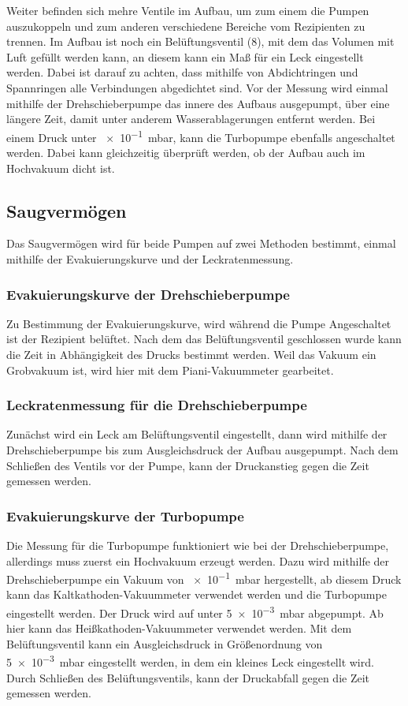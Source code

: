Weiter befinden sich mehre Ventile im Aufbau, um zum einem die Pumpen auszukoppeln und zum anderen verschiedene Bereiche vom Rezipienten zu trennen. Im Aufbau ist noch ein Belüftungsventil (8), mit dem das Volumen mit Luft gefüllt werden kann, an diesem kann ein Maß für ein Leck eingestellt werden.
Dabei ist darauf zu achten, dass mithilfe von Abdichtringen und Spannringen alle Verbindungen abgedichtet sind.
Vor der Messung wird einmal mithilfe der Drehschieberpumpe  das innere des Aufbaus ausgepumpt, über eine längere Zeit, damit unter anderem \glqq Wasserablagerungen\grqq{} entfernt werden. Bei einem Druck unter \SI{e-1}{\milli\bar}, kann die Turbopumpe ebenfalls angeschaltet werden. Dabei kann gleichzeitig überprüft werden, ob der Aufbau auch im Hochvakuum dicht ist.
\subsection{Saugvermögen}
Das Saugvermögen wird für beide Pumpen auf zwei Methoden bestimmt, einmal mithilfe der Evakuierungskurve und der Leckratenmessung.
\subsubsection{Evakuierungskurve der Drehschieberpumpe}
Zu Bestimmung der Evakuierungskurve, wird während die Pumpe Angeschaltet ist der Rezipient belüftet. Nach dem das Belüftungsventil geschlossen wurde kann die Zeit in Abhängigkeit des Drucks bestimmt werden. 
Weil das Vakuum ein Grobvakuum ist, wird hier mit dem Piani-Vakuummeter gearbeitet.
\subsubsection{Leckratenmessung für die Drehschieberpumpe}
Zunächst wird ein Leck am Belüftungsventil eingestellt, dann wird mithilfe der Drehschieberpumpe bis zum Ausgleichsdruck der Aufbau ausgepumpt. Nach dem Schließen des Ventils vor der Pumpe, kann der Druckanstieg gegen die Zeit gemessen werden. 
\subsubsection{Evakuierungskurve der Turbopumpe}
Die Messung für die Turbopumpe funktioniert wie bei der Drehschieberpumpe, allerdings muss zuerst ein Hochvakuum erzeugt werden. Dazu wird mithilfe der Drehschieberpumpe ein Vakuum von \SI{e-1}{\milli\bar} hergestellt, ab diesem Druck kann das Kaltkathoden-Vakuummeter verwendet werden und die Turbopumpe eingestellt werden. Der Druck wird auf unter \SI{5e-3}{\milli\bar} abgepumpt. Ab hier kann das Heißkathoden-Vakuummeter verwendet werden. Mit dem Belüftungsventil kann ein Ausgleichsdruck in Größenordnung von \SI{5e-3}{\milli\bar} eingestellt werden, in dem ein kleines Leck eingestellt wird. Durch Schließen des Belüftungsventils, kann der Druckabfall gegen die Zeit gemessen werden.
